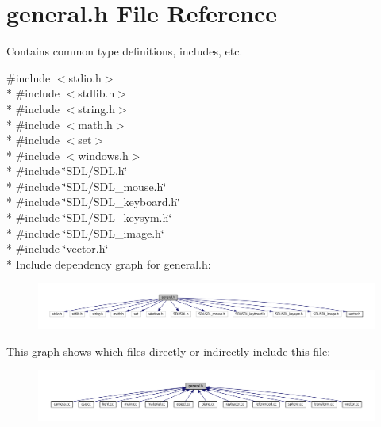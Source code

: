 \section{general.\+h File Reference}
\label{general_8h}


Contains common type definitions, includes, etc.  


{\ttfamily \#include $<$stdio.\+h$>$}\\*
{\ttfamily \#include $<$stdlib.\+h$>$}\\*
{\ttfamily \#include $<$string.\+h$>$}\\*
{\ttfamily \#include $<$math.\+h$>$}\\*
{\ttfamily \#include $<$set$>$}\\*
{\ttfamily \#include $<$windows.\+h$>$}\\*
{\ttfamily \#include \char`\"{}S\+D\+L/\+S\+D\+L.\+h\char`\"{}}\\*
{\ttfamily \#include \char`\"{}S\+D\+L/\+S\+D\+L\+\_\+mouse.\+h\char`\"{}}\\*
{\ttfamily \#include \char`\"{}S\+D\+L/\+S\+D\+L\+\_\+keyboard.\+h\char`\"{}}\\*
{\ttfamily \#include \char`\"{}S\+D\+L/\+S\+D\+L\+\_\+keysym.\+h\char`\"{}}\\*
{\ttfamily \#include \char`\"{}S\+D\+L/\+S\+D\+L\+\_\+image.\+h\char`\"{}}\\*
{\ttfamily \#include \char`\"{}vector.\+h\char`\"{}}\\*
Include dependency graph for general.\+h\+:
\nopagebreak
\begin{figure}[H]
\begin{center}
\leavevmode
\includegraphics[width=350pt]{general_8h__incl}
\end{center}
\end{figure}
This graph shows which files directly or indirectly include this file\+:
\nopagebreak
\begin{figure}[H]
\begin{center}
\leavevmode
\includegraphics[width=350pt]{general_8h__dep__incl}
\end{center}
\end{figure}
